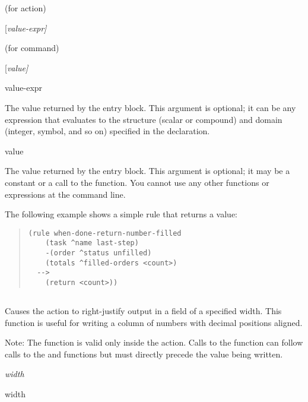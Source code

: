 {{\Format (for action)

 [\it{value-expr}]

\Format

(for command)

 [\it{value}]

\begin{arguments}
\item[value-expr]

  The value returned by the entry block. This argument is optional; it
  can be any expression that evaluates to the structure (scalar or
  compound) and domain (integer, symbol, and so on) specified in the
   declaration.

\item[value]

  The value returned by the entry block. This argument is optional; it
  may be a constant or a call to the  function. You cannot use
  any other functions or expressions at the command line.
\end{arguments}

\Example

The following example shows a simple rule that returns a
value:

\begin{quote}
\begin{verbatim}
(rule when-done-return-number-filled
    (task ^name last-step)
    -(order ^status unfilled)
    (totals ^filled-orders <count>)
  -->
    (return <count>))
\end{verbatim}
\end{quote}

\subsection{}

Causes the  action to right-justify output in a field of a
specified width. This function is useful for writing a column of
numbers with decimal positions aligned.

Note: The  function is valid only inside the 
action. Calls to the  function can follow calls to the
 and  functions but must directly precede the value
being written.

\Format

 \it{width}

\begin{argument}
\item[width]


\end{argument}}}
